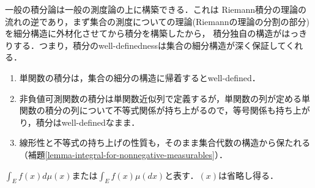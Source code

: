 \documentclass[uplatex, dvipdfmx]{jsreport}
\begin{document}
\begin{tcolorbox}[colframe=ForestGreen, colback=ForestGreen!10!white,breakable,colbacktitle=ForestGreen!40!white,coltitle=black,fonttitle=\bfseries\sffamily,
title=測度論は集合代数系であるとしたら，その上で積分を代数的に構築する頑健な理論である]
    一般の積分論は一般の測度論の上に構築できる．これは
    Riemann積分の理論の流れの逆であり，まず集合の測度についての理論(Riemannの理論の分割の部分)を細分構造に外材化させてから積分を構築したから，
    積分独自の構造がはっきりする．つまり，積分のwell-definednessは集合の細分構造が深く保証してくれる．

    \begin{enumerate}
        \item 単関数の積分は，集合の細分の構造に帰着するとwell-defined．
        \item 非負値可測関数の積分は単関数近似列で定義するが，単関数の列が定める単関数の積分の列について不等式関係が持ち上がるので，等号関係も持ち上がり，積分はwell-definedなまま．
        \item 線形性と不等式の持ち上げの性質も，そのまま集合代数の構造から保たれる（補題\ref{lemma-integral-for-nonnegative-measurables}）．
    \end{enumerate}
\end{tcolorbox}

\begin{notation}
    $\int_Ef(x)d\mu(x)$または$\int_Ef(x)\mu(dx)$と表す．$(x)$は省略し得る．
\end{notation}
\end{document}
